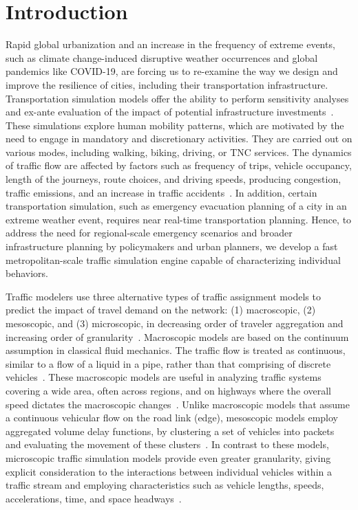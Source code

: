 \documentclass[final]{IEEEtran}
\begin{document}
\section{Introduction}
Rapid global urbanization and an increase in the frequency of extreme events, such as climate change-induced disruptive weather occurrences and global pandemics like COVID-19, are forcing us to re-examine the way we design and improve the resilience of cities, including their transportation infrastructure. Transportation simulation models offer the ability to perform sensitivity analyses and ex-ante evaluation of the impact of potential infrastructure investments~\cite{kokkinogenisNextgenerationTrafficSimulation2011, garcia-doradoDesigningLargescaleInteractive2014, waddellUrbanSimModelingUrban2002}. These simulations explore human mobility patterns, which are motivated by the need to engage in mandatory and discretionary activities. They are carried out on various modes, including walking, biking, driving, or TNC services. The dynamics of traffic flow are affected by factors such as frequency of trips, vehicle occupancy, length of the journeys, route choices, and driving speeds, producing congestion, traffic emissions, and an increase in traffic accidents~\cite{zhaoAgentBasedModelABM}. In addition, certain transportation simulation, such as emergency evacuation planning of a city in an extreme weather event, requires near real-time transportation planning. Hence, to address the need for regional-scale emergency scenarios and broader infrastructure planning by policymakers and urban planners, we develop a fast metropolitan-scale traffic simulation engine capable of characterizing individual behaviors.

Traffic modelers use three alternative types of traffic assignment models to predict the impact of travel demand on the network: (1) macroscopic, (2) mesoscopic, and (3) microscopic, in decreasing order of traveler aggregation and increasing order of granularity~\cite{milamClosingInducedVehicle2017, waraichPerformanceImprovementsLargeScale2015}. Macroscopic models are based on the continuum assumption in classical fluid mechanics. The traffic flow is treated as continuous, similar to a flow of a liquid in a pipe, rather than that comprising of discrete vehicles~\cite{maerivoetTransportationPlanningTraffic2005a}.  These macroscopic models are useful in analyzing traffic systems covering a wide area, often across regions, and on highways where the overall speed dictates the macroscopic changes~\cite{kokkinogenisNextgenerationTrafficSimulation2011}. Unlike macroscopic models that assume a continuous vehicular flow on the road link (edge), mesoscopic models employ aggregated volume delay functions, by clustering a set of vehicles into packets and evaluating the movement of these clusters~\cite{kokkinogenisNextgenerationTrafficSimulation2011}. In contrast to these models, microscopic traffic simulation models provide even greater granularity, giving explicit consideration to the interactions between individual vehicles within a traffic stream and employing characteristics such as vehicle lengths, speeds, accelerations, time, and space headways~\cite{toledoMicroscopicTrafficSimulation2005}. 
\end{document}
